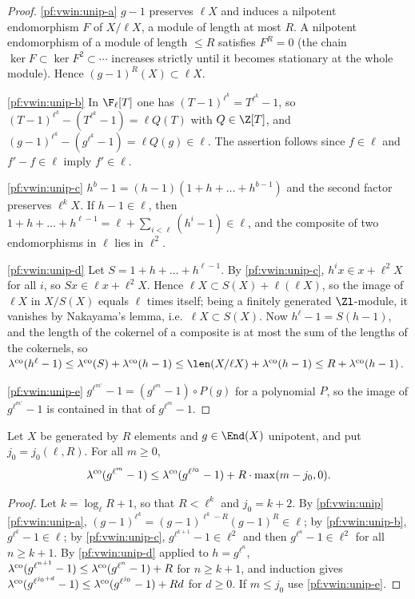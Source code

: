 \begin{proof}
\ref{pf:vwin:unip-a} $g-1$ preserves $\ell X$ and induces a nilpotent endomorphism $F$ of $X/\ell X$, a module of length at most
$R$. A nilpotent endomorphism of a module of length $\le R$ satisfies $F^R=0$ (the chain $\ker F\subset\ker F^2\subset\cdots$
increases strictly until it becomes stationary at the whole module). Hence $(g-1)^R(X)\subset\ell X$.

\ref{pf:vwin:unip-b} In $\F_\ell[T]$ one has $(T-1)^{\ell^k}=T^{\ell^k}-1$, so $(T-1)^{\ell^k}-(T^{\ell^k}-1)=\ell Q(T)$ with
$Q\in\Z[T]$, and $(g-1)^{\ell^k}-(g^{\ell^k}-1)=\ell Q(g)\in\ell$. The assertion follows since $f\in\ell$ and $f'-f\in\ell$ imply
$f'\in\ell$.

\ref{pf:vwin:unip-c} $h^b-1=(h-1)(1+h+\dots+h^{b-1})$ and the second factor preserves $\ell^kX$. If $h-1\in\ell$, then
$1+h+\dots+h^{\ell-1}=\ell+\sum_{i<\ell}(h^i-1)\in\ell$, and the composite of two endomorphisms in $\ell$ lies in $\ell^2$.

\ref{pf:vwin:unip-d} Let $S=1+h+\dots+h^{\ell-1}$. By \ref{pf:vwin:unip-c}, $h^i x\in x+\ell^2X$ for all $i$, so $Sx\in\ell x+\ell^2X$.
Hence $\ell X\subset S(X)+\ell(\ell X)$, so the image of $\ell X$ in $X/S(X)$ equals $\ell$ times itself; being a finitely
generated $\Zl$-module, it vanishes by Nakayama's lemma, i.e.\ $\ell X\subset S(X)$. Now $h^\ell-1=S(h-1)$, and the length of the
cokernel of a composite is at most the sum of the lengths of the cokernels, so
$\vwincok(h^\ell-1)\le\vwincok(S)+\vwincok(h-1)\le\len(X/\ell X)+\vwincok(h-1)\le R+\vwincok(h-1)$.

\ref{pf:vwin:unip-e} $g^{\ell^{m'}}-1=(g^{\ell^m}-1)\circ P(g)$ for a polynomial $P$, so the image of $g^{\ell^{m'}}-1$ is contained
in that of $g^{\ell^m}-1$.
\end{proof}

\begin{lemma}[Growth]\label{pf:vwin:growth}
Let $X$ be generated by $R$ elements and $g\in\End(X)$ unipotent, and put $j_0=j_0(\ell,R)$. For all $m\ge0$,
\[
 \lambda^{\mathrm{co}}(g^{\ell^m}-1)\le\lambda^{\mathrm{co}}(g^{\ell^{j_0}}-1)+R\cdot\max(m-j_0,0) .
\]
\end{lemma}

\begin{proof}
Let $k=\log_\ell R+1$, so that $R<\ell^k$ and $j_0=k+2$. By \cref{pf:vwin:unip}\ref{pf:vwin:unip-a},
$(g-1)^{\ell^k}=(g-1)^{\ell^k-R}(g-1)^R\in\ell$; by \ref{pf:vwin:unip-b}, $g^{\ell^k}-1\in\ell$; by \ref{pf:vwin:unip-c},
$g^{\ell^{k+1}}-1\in\ell^2$ and then $g^{\ell^n}-1\in\ell^2$ for all $n\ge k+1$. By \ref{pf:vwin:unip-d} applied to
$h=g^{\ell^n}$, $\lambda^{\mathrm{co}}(g^{\ell^{n+1}}-1)\le\lambda^{\mathrm{co}}(g^{\ell^n}-1)+R$ for $n\ge k+1$, and induction gives
$\lambda^{\mathrm{co}}(g^{\ell^{j_0+d}}-1)\le\lambda^{\mathrm{co}}(g^{\ell^{j_0}}-1)+Rd$ for $d\ge0$. If $m\le j_0$ use \ref{pf:vwin:unip-e}.
\end{proof}

